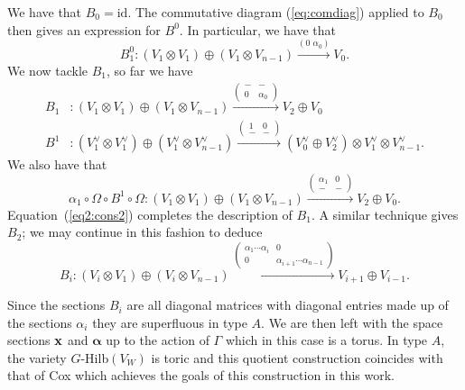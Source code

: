 \documentclass{amsart}
\newcommand{\balpha}{\boldsymbol{\alpha}}
\theoremstyle{definition}
\newcommand\VW{V_W}
\begin{document}
We have that $B_0 = \text{id}$.
The commutative diagram (\ref{eq:comdiag}) applied to $B_0$ then gives an expression for $B^0$.
In particular, we have that 
$$B_1^0 \colon (V_1 \otimes V_1) \oplus (V_1 \otimes V_{n-1}) \xrightarrow{(0\,\, \alpha_0)} V_0.$$
We now tackle $B_1$, so far we have 
\begin{align*}
    B_1 &\colon (V_1 \otimes V_1) \oplus (V_1 \otimes V_{n-1}) \xrightarrow{\begin{pmatrix} - & - \\ 0 & \alpha_0 \end{pmatrix}} V_2 \oplus V_0 \\
    B^1 &\colon (V_1^\vee \otimes V_1^\vee) \oplus (V_1^\vee \otimes V_{n-1}^\vee) \xrightarrow{\begin{pmatrix} 1 & 0 \\ - & - \end{pmatrix}} (V_0^\vee \oplus V_2^\vee) \otimes V_1^\vee \otimes V_{n-1}^\vee.
\end{align*}
We also have that
$$\alpha_1 \circ \Omega \circ B^1 \circ \Omega \colon (V_1 \otimes V_1) \oplus (V_1 \otimes V_{n-1}) \xrightarrow{\begin{pmatrix} \alpha_1 & 0 \\ - & - \end{pmatrix}} V_2 \oplus V_0.$$
Equation~(\ref{eq2:cons2}) completes the description of $B_1$.
A similar technique gives $B_2$; we may continue in this fashion to deduce 
$$B_i \colon (V_i \otimes V_1) \oplus (V_i \otimes V_{n-1}) \xrightarrow{\begin{pmatrix} \alpha_1\cdots\alpha_i & 0 \\ 0 & \alpha_{i+1}\cdots\alpha_{n-1} \end{pmatrix}} V_{i+1} \oplus V_{i-1}.$$

Since the sections $B_i$ are all diagonal matrices with diagonal entries made up of the sections $\alpha_i$ they are superfluous in type $A$.
We are then left with the space sections $\mathbf{x}$ and $\balpha$ up to the action of $\Gamma$ which in this case is a torus.
In type $A$, the variety $G$-Hilb$(\VW)$ is toric and this quotient construction coincides with that of Cox which achieves the goals of this construction in this work.
\end{document}
